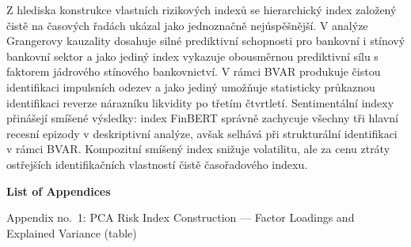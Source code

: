 \documentclass[12pt,a4paper]{report}
\begin{document}
Z hlediska konstrukce vlastních rizikových indexů se hierarchický index založený čistě na časových řadách ukázal jako jednoznačně nejúspěšnější. V analýze Grangerovy kauzality dosahuje silné prediktivní schopnosti pro bankovní i stínový bankovní sektor a jako jediný index vykazuje obousměrnou prediktivní sílu s faktorem jádrového stínového bankovnictví. V rámci BVAR produkuje čistou identifikaci impulsních odezev a jako jediný umožňuje statisticky průkaznou identifikaci reverze nárazníku likvidity po třetím čtvrtletí. Sentimentální indexy přinášejí smíšené výsledky: index FinBERT správně zachycuje všechny tři hlavní recesní epizody v deskriptivní analýze, avšak selhává při strukturální identifikaci v rámci BVAR. Kompozitní smíšený index snižuje volatilitu, ale za cenu ztráty ostřejších identifikačních vlastností čistě časořadového indexu.

\nocite{*}
\printbibliography




\noindent\textbf{List of Appendices}


\noindent Appendix no.\ 1: PCA Risk Index Construction --- Factor Loadings and Explained Variance (table)
\end{document}
